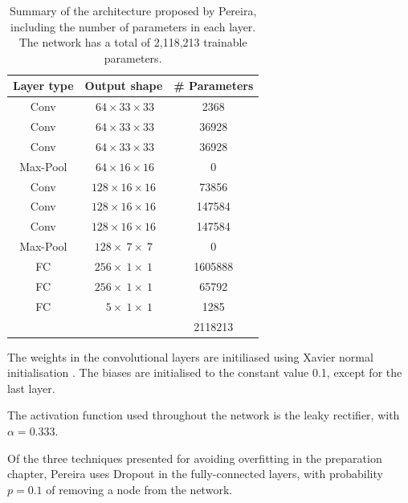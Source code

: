 \documentclass[12pt,a4paper,twoside,openright]{report}
\begin{document}
\begin{table}
\centering	
\begin{tabular}{ c c S[table-format=7.0] } 
\textbf{Layer type} & \textbf{Output shape} & \textbf{\# Parameters} \\
 \hline
 Conv 		& $\ 64 	\times 33 	\times 33$ 	& 2368 \\ 
 Conv 		& $\ 64 	\times 33 	\times 33$ 	& 36928 \\ 
 Conv 		& $\ 64 	\times 33 	\times 33$	& 36928 \\ 
Max-Pool 	& $\ 64 	\times 16 	\times 16$ 	& 0\\
 Conv 		& $128 		 \times 16 	\times 16$	& 73856 \\ 
 Conv 		& $128 		\times 16 	\times 16$ 	& 147584 \\ 
 Conv 		& $128 		\times 16 	\times 16$ 	& 147584 \\ 
Max-Pool 	& $128 		\times\ 7 	\times\ 7$	& 0\\
FC			& $256 		\times\ 1 	\times\ 1$	& 1605888\\
FC			& $256 		\times\ 1 	\times\ 1$	& 65792\\
FC			& $\quad 5 	\times\ 1 	\times\ 1$ 	& 1285\\
\hhline{~~=}
\rule{0pt}{3ex}    
&& 2118213\\
\end{tabular}
\caption[Summary of the architecture proposed by Pereira.]{Summary of the architecture proposed by Pereira, including the number of parameters in each layer. The network has a total of 2,118,213 trainable parameters.}
\label{table:pereira_weights}
\end{table}


The weights in the convolutional layers are initiliased using Xavier normal initialisation \cite{xavier_init}. The biases are initialised to the constant value 0.1, except for the last layer.

The activation function used throughout the network is the leaky rectifier, with  $\alpha = 0.333$.

Of the three techniques presented for avoiding overfitting in the preparation chapter, Pereira uses Dropout \cite{dropout} in the fully-connected layers, with probability $p=0.1$ of removing a node from the network.
\end{document}
